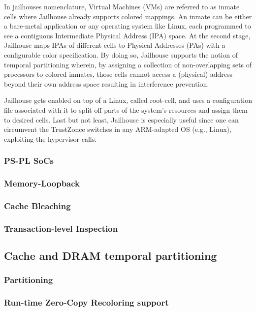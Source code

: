 In jailhouses 
nomenclature, Virtual Machines (VMs) are referred to as inmate cells where Jailhouse already supports colored mappings. An inmate can be either a bare-metal application or any operating system like Linux, each programmed to see a contiguous Intermediate Physical Address (IPA) space. At the second stage, Jailhouse maps IPAs of different cells to Physical Addresses (PAs) with a configurable color specification. By doing so, Jailhouse supports the notion of temporal partitioning wherein, by assigning a collection of non-overlapping sets of processors to colored inmates, those cells cannot access a (physical) address beyond their own address space resulting in interference prevention.

Jailhouse gets enabled on top of a Linux, called root-cell, and uses a configuration file associated with it to split off parts of the system's resources and assign them to desired cells. Last but not least, Jailhouse is especially useful since one can circumvent the TrustZonce switches in any ARM-adapted OS (e.g., Linux), exploiting the hypervisor calls.

\subsubsection{PS-PL SoCs}
\subsubsection{Memory-Loopback}
\subsubsection{Cache Bleaching}
\subsubsection{Transaction-level Inspection}


\subsection{Cache and DRAM temporal partitioning}

\subsubsection{Partitioning}
        \subsubsection{Run-time Zero-Copy Recoloring support}

